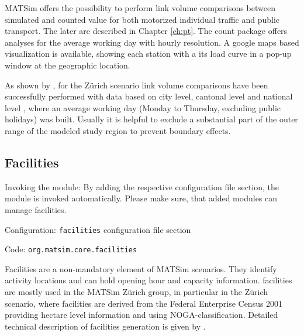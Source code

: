 MATSim offers the possibility to perform link volume comparisons between simulated and counted value for both motorized individual traffic \citep{Horni_unpub_IVT_2007}  and public transport. The later are described in Chapter \ref{ch:pt}. The count package offers analyses for the average working day with hourly resolution. A google maps based visualization is available, showing each station with a its load curve in a pop-up window at the geographic location.

As shown by \citet[][]{BalmerEtAl_ResRep_bdktzrh_2009}, for the Zürich scenario link volume comparisons have been successfully performed with data based on city level, cantonal level and national level \citep[][]{ASTRA_Webpage_2006}, where an average working day (Monday to Thursday, excluding public holidays) was built. Usually it is helpful to exclude a substantial part of the outer range of the modeled study region to prevent boundary effects.

\subsection{Facilities}
\label{sec:facilities}
\begin{compactitem}
\item Invoking the module: By adding the respective configuration file section, the module is invoked automatically. Please make sure, that added modules can manage facilities.
\item Configuration: \lstinline|facilities| configuration file section
\item Code: \lstinline|org.matsim.core.facilities|
\end{compactitem}

Facilities are a non-mandatory element of MATSim scenarios. They identify activity locations and can hold opening hour and capacity information. facilities are mostly used in the MATSim Zürich group, in particular in the Zürich scenario, where facilities are derived from the Federal Enterprise Census 2001 \citep[][]{SwissEnterpriseCensus_manual_2001} providing hectare level information and using NOGA-classification. Detailed technical description of facilities generation is given by \citet[][]{Meister_TechRep_IVT_2008, Meister_unpub_IVT_2007}.


